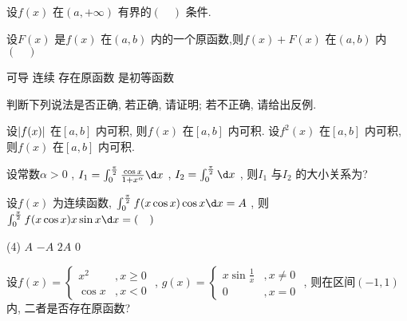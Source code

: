 \begin{question}
    设$ f(x) $ 在$ (a, +\infty) $ 有界的$ (\quad) $ 条件.
\end{question}
\begin{question}
    设$ F(x) $ 是$ f(x) $ 在$ (a, b) $ 内的一个原函数,则$ f(x) + F(x) $ 在$ (a, b) $ 内$ (\quad) $ 
    \begin{tasks}
        \task   可导
        \task   连续
        \task   存在原函数
        \task   是初等函数
    \end{tasks}
\end{question}
\begin{question}
    判断下列说法是否正确, 若正确, 请证明; 若不正确, 请给出反例.
    \begin{tasks}
        \task   设$ \lvert f(x)\rvert $ 在$ [a, b] $ 内可积, 则$ f(x) $ 在$ [a, b] $ 内可积.
        \task   设$ f^2(x) $ 在$ [a, b] $ 内可积, 则$ f(x) $ 在$ [a, b] $ 内可积.
    \end{tasks}
\end{question}
\begin{question}
    设常数$ \alpha > 0 $ , $ I_1 = \int_{0}^{\frac{\pi}{2}} \frac{\cos x}{1 + x^{\alpha}} \d x $ , $ I_2 = \int_{0}^{\frac{\pi}{2}} \d x $ , 则$ I_1 $ 与$ I_2 $ 的大小关系为?
\end{question}
\begin{question}
    设$ f(x) $ 为连续函数, $ \int_{0}^{\frac{\pi}{2}} f(x \cos x) \cos x \d x = A $ , 则$ \int_{0}^{\frac{\pi}{2}} f(x \cos x) x \sin x \d x = (\quad) $ 
    \begin{tasks}(4)
        \task   $ A $ 
        \task   $ -A $ 
        \task   $ 2A $ 
        \task   $ 0 $ 
    \end{tasks}
\end{question}
\begin{question}
    设$ f(x) = \begin{cases}
        x^2 &, x \ge 0   \\
        \cos x &, x < 0
    \end{cases} $ , $ g(x) = \begin{cases}
        x \sin \frac 1 x &, x \neq 0  \\
        0 &, x = 0
    \end{cases} $ , 则在区间$ (-1, 1) $ 内, 二者是否存在原函数?
\end{question}
